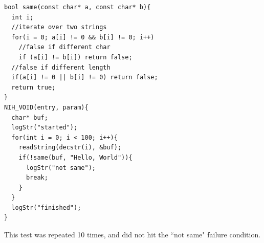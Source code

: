 \documentclass{article}
\begin{document}
\begin{enumerate}
\begin{tcolorbox}[colback=white,grow to left by=2.5mm,grow to right by=2.5mm,left*=0mm,right*=0mm,sharp corners]
\begin{verbatim}
bool same(const char* a, const char* b){
  int i;
  //iterate over two strings
  for(i = 0; a[i] != 0 && b[i] != 0; i++)
    //false if different char
    if (a[i] != b[i]) return false;
  //false if different length
  if(a[i] != 0 || b[i] != 0) return false;
  return true;
}
NIH_VOID(entry, param){
  char* buf;
  logStr("started");
  for(int i = 0; i < 100; i++){
    readString(decstr(i), &buf);
    if(!same(buf, "Hello, World")){
      logStr("not same");
      break;
    }
  }
  logStr("finished");
}
\end{verbatim}
\end{tcolorbox}

This test was repeated 10 times, and did not hit the ``not same" failure condition.

\end{enumerate}
\end{document}
